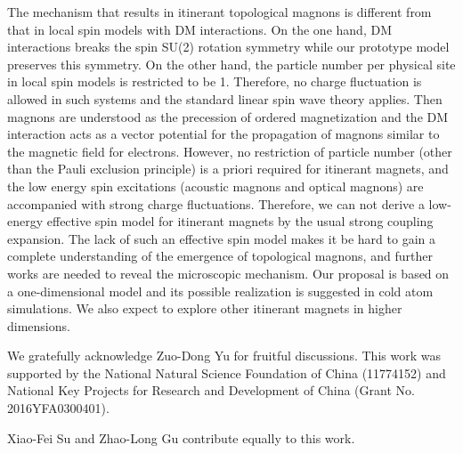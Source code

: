 \documentclass[amsmath,superscriptaddress,showpacs,aps,prb,twocolumn]{revtex4-1}
\begin{document}
\par The mechanism that results in itinerant topological magnons is different from that in local spin models with DM interactions. On the one hand, DM interactions breaks the spin SU(2) rotation symmetry while our prototype model preserves this symmetry. On the other hand, the particle number per physical site in local spin models is restricted to be 1. Therefore, no charge fluctuation is allowed in such systems and the standard linear spin wave theory applies. Then magnons are understood as the precession of ordered magnetization and the DM interaction acts as a vector potential for the propagation of magnons similar to the magnetic field for electrons. However, no restriction of particle number (other than the Pauli exclusion principle) is a priori required for itinerant magnets, and the low energy spin excitations (acoustic magnons and optical magnons) are accompanied with strong charge fluctuations. Therefore, we can not derive a low-energy effective spin model for itinerant magnets by the usual strong coupling expansion. The lack of such an effective spin model makes it be hard to gain a complete understanding of the emergence of topological magnons, and further works are needed to reveal the microscopic mechanism. Our proposal is based on a one-dimensional model and its possible realization is suggested in cold atom simulations. We also expect to explore other itinerant magnets in higher dimensions.

\begin{acknowledgments}
\par We gratefully acknowledge Zuo-Dong Yu for fruitful discussions. This work was supported by the National Natural Science Foundation of China (11774152) and National Key Projects for Research and Development of China (Grant No. 2016YFA0300401).
\par Xiao-Fei Su and Zhao-Long Gu contribute equally to this work.
\end{acknowledgments}


\end{document}
